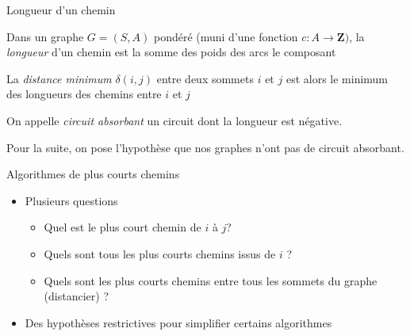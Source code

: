 
\begin{frame}{Longueur d'un chemin}
    \begin{definition}
        Dans un graphe $G=(S,A)$ pondéré (muni d'une fonction $c:A \longrightarrow \mathbf{Z})$, la \emph{longueur} d'un chemin est la somme des poids des arcs le composant 
    \end{definition}
    \begin{definition}
       La \emph{distance minimum} $\delta(i,j)$ entre deux sommets $i$ et $j$ est alors le minimum des longueurs des chemins entre $i$ et $j$ 
    \end{definition}
\begin{definition}
    On appelle \emph{circuit absorbant} un circuit dont la longueur est négative.
\end{definition}
Pour la suite, on pose l'hypothèse que nos graphes n'ont pas de circuit absorbant.

\end{frame}

\begin{frame}{Algorithmes de plus courts chemins}
    \begin{itemize}
        \item Plusieurs questions
        \begin{itemize}
            \item Quel est le plus court chemin de $i$ à $j$?
            \item Quels sont tous les plus courts chemins issus de $i$ ?
            \item Quels sont les plus courts chemins entre tous les sommets du graphe (distancier) ?
        \end{itemize}
        \item Des hypothèses restrictives pour simplifier certains algorithmes
    \end{itemize}
\end{frame}

